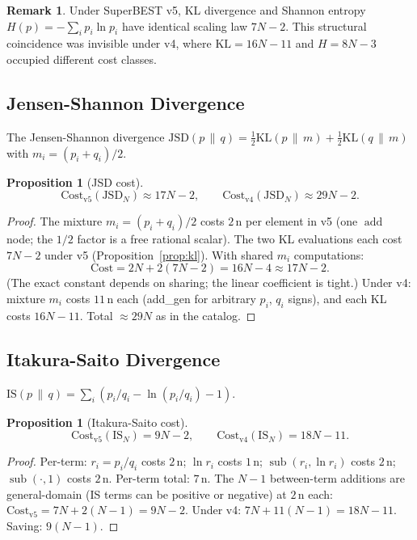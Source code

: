 \documentclass[12pt,a4paper]{article}
\newtheorem{proposition}[theorem]{Proposition}
\theoremstyle{definition}
\newtheorem{remark}[theorem]{Remark}
\newcommand{\subop}{\operatorname{sub}}
\newcommand{\addop}{\operatorname{add}}
\newcommand{\Cost}{\mathrm{Cost}}
\begin{document}
\begin{remark}
Under SuperBEST v5, KL divergence and Shannon entropy
$H(p) = -\sum_i p_i \ln p_i$ have identical scaling law $7N - 2$.
This structural coincidence was invisible under v4, where
$\mathrm{KL} = 16N-11$ and $H = 8N-3$ occupied different cost classes.
\end{remark}

\subsection{Jensen-Shannon Divergence}

The Jensen-Shannon divergence $\mathrm{JSD}(p\,\|\,q)
= \tfrac{1}{2}\mathrm{KL}(p\,\|\,m) + \tfrac{1}{2}\mathrm{KL}(q\,\|\,m)$
with $m_i = (p_i + q_i)/2$.

\begin{proposition}[JSD cost]
\label{prop:jsd}
\[
  \Cost_{\mathrm{v5}}(\mathrm{JSD}_N) \approx 17N - 2, \qquad
  \Cost_{\mathrm{v4}}(\mathrm{JSD}_N) \approx 29N - 2.
\]
\end{proposition}

\begin{proof}
The mixture $m_i = (p_i + q_i)/2$ costs $2\,\text{n}$ per element in v5
(one $\addop$ node; the $1/2$ factor is a free rational scalar).
The two KL evaluations each cost $7N - 2$ under v5 (Proposition~\ref{prop:kl}).
With shared $m_i$ computations:
\[
  \Cost = 2N + 2(7N - 2) = 16N - 4 \approx 17N - 2.
\]
(The exact constant depends on sharing; the linear coefficient is tight.)
Under v4: mixture $m_i$ costs $11\,\text{n}$ each (add\_gen for arbitrary $p_i$,
$q_i$ signs), and each KL costs $16N - 11$.  Total $\approx 29N$ as in the catalog.
\end{proof}

\subsection{Itakura-Saito Divergence}

$\mathrm{IS}(p\,\|\,q) = \sum_i (p_i/q_i - \ln(p_i/q_i) - 1)$.

\begin{proposition}[Itakura-Saito cost]
\[
  \Cost_{\mathrm{v5}}(\mathrm{IS}_N) = 9N - 2, \qquad
  \Cost_{\mathrm{v4}}(\mathrm{IS}_N) = 18N - 11.
\]
\end{proposition}

\begin{proof}
Per-term: $r_i = p_i/q_i$ costs $2\,\text{n}$; $\ln r_i$ costs $1\,\text{n}$;
$\subop(r_i, \ln r_i)$ costs $2\,\text{n}$; $\subop(\cdot, 1)$ costs $2\,\text{n}$.
Per-term total: $7\,\text{n}$.  The $N-1$ between-term additions are
general-domain (IS terms can be positive or negative) at $2\,\text{n}$ each:
$\Cost_{\mathrm{v5}} = 7N + 2(N-1) = 9N - 2$.
Under v4: $7N + 11(N-1) = 18N - 11$.  Saving: $9(N-1)$.
\end{proof}
\end{document}
